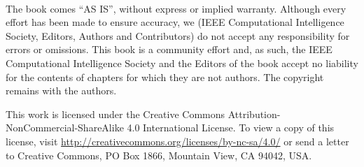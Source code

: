 \thispagestyle{empty}
\ 
\vspace{7cm}

The book comes “AS IS”, without express or implied warranty. Although every effort has been made to ensure accuracy, we (IEEE Computational Intelligence Society, Editors, Authors and Contributors) do not accept any responsibility for errors or omissions.
This book is a community effort and, as such, the IEEE Computational Intelligence Society and the Editors of the book accept no liability for the contents of chapters for which they are not authors. The copyright remains with the authors.

This work is licensed under the Creative Commons Attribution-\\NonCommercial-ShareAlike 4.0 International License. To view a copy of this license, visit \url{http://creativecommons.org/licenses/by-nc-sa/4.0/} or send a letter to Creative Commons, PO Box 1866, Mountain View, CA 94042, USA.

